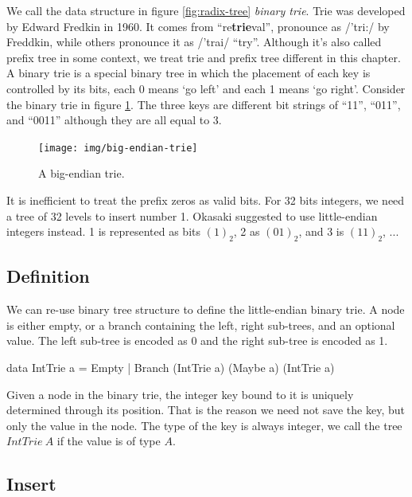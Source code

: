 \documentclass[b5paper]{article}
\begin{document}
We call the data structure in figure \ref{fig:radix-tree} \emph{binary trie}. Trie was developed by Edward Fredkin in 1960. It comes from ``re\textbf{trie}val'', pronounce as /'tri:/ by Freddkin, while others pronounce it as /'trai/ ``try''\cite{wiki-trie}. Although it's also called prefix tree in some context, we treat trie and prefix tree different in this chapter. A binary trie is a special binary tree in which the placement of each key is controlled by its bits, each 0 means `go left' and each 1 means `go right'\cite{okasaki-int-map}. Consider the binary trie in figure \ref{fig:big-endian-trie}. The three keys are different bit strings of ``11'', ``011'', and ``0011'' although they are all equal to 3.

\begin{figure}[htbp]
  \centering
  \texttt{[image: img/big-endian-trie]}
  \caption{A big-endian trie.}
  \label{fig:big-endian-trie}
\end{figure}

It is inefficient to treat the prefix zeros as valid bits. For 32 bits integers, we need a tree of 32 levels to insert number 1. Okasaki suggested to use little-endian integers instead\cite{okasaki-int-map}. 1 is represented as bits $(1)_2$, 2 as $(01)_2$, and 3 is $(11)_2$, ...

\subsection{Definition}
We can re-use binary tree structure to define the little-endian binary trie. A node is either empty, or a branch containing the left, right sub-trees, and an optional value. The left sub-tree is encoded as 0 and the right sub-tree is encoded as 1.

\lstset{frame = single}
\begin{Haskell}
data IntTrie a = Empty | Branch (IntTrie a) (Maybe a) (IntTrie a)
\end{Haskell}

Given a node in the binary trie, the integer key bound to it is uniquely determined through its position. That is the reason we need not save the key, but only the value in the node. The type of the key is always integer, we call the tree $IntTrie\ A$ if the value is of type $A$.

\subsection{Insert}
\end{document}
